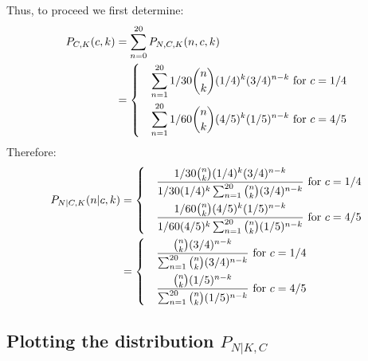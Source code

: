 \documentclass[paper=a4, fontsize=11pt]{scrartcl} %
\numberwithin{equation}{section} %
\numberwithin{figure}{section} %
\numberwithin{table}{section} %
\begin{document}
Thus, to proceed we first determine:
\begin{align*}
P_{C, K}(c,k) &= \sum_{n = 0}^{20} P_{N, C, K}(n, c, k)\\
   &=
   \begin{dcases}
      & \sum_{n = 1}^{20} 1/30 {n \choose k} (1/4)^k (3/4)^{n-k} \textrm{  for } c = 1/4\\
      & \sum_{n = 1}^{20} 1/60 {n \choose k} (4/5)^k (1/5)^{n-k} \textrm{  for } c = 4/5
   \end{dcases}
\end{align*}
Therefore:
\begin{align*}
P_{N | C, K}(n | c,k) &=
   \begin{dcases}
      & \frac{1/30 {n \choose k}(1/4)^k (3/4)^{n-k}}{1/30 (1/4)^k \sum_{n = 1}^{20} {n \choose k} (3/4)^{n-k}} \textrm{  for } c = 1/4 \\
      & \frac{1/60 {n \choose k}(4/5)^k (1/5)^{n-k}}{1/60 (4/5)^k \sum_{n = 1}^{20} {n \choose k} (1/5)^{n-k}} \textrm{  for } c = 4/5
   \end{dcases}
   \\
    &= 
     \begin{dcases}
      & \frac{{n \choose k}(3/4)^{n-k}}{\sum_{n = 1}^{20} {n \choose k} (3/4)^{n-k}} \textrm{  for } c = 1/4 \\
      & \frac{{n \choose k}(1/5)^{n-k}}{\sum_{n = 1}^{20} {n \choose k} (1/5)^{n-k}} \textrm{  for } c = 4/5
   \end{dcases}
\end{align*}


\subsection{Plotting the distribution $P_{N | K, C}$}
 
\end{document}
